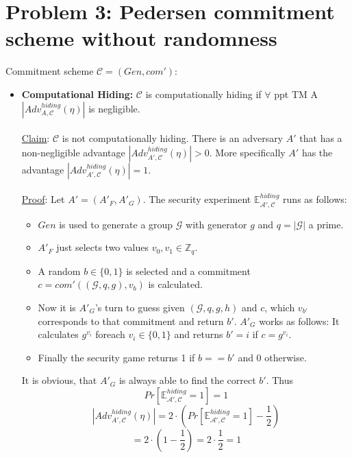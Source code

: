 \documentclass[12pt,pdftex,a4paper]{article}
\begin{document}
\section*{Problem 3: Pedersen commitment scheme without randomness}
Commitment scheme $\mathcal{C} = (Gen, com')$:
\begin{itemize}
\item \textbf{Computational Hiding:} 
$\mathcal{C}$ is computationally hiding if $\forall$ ppt TM A $|Adv_{A,\mathcal{C}}^{hiding}(\eta)|$ is negligible.
\\~\\
\underline{Claim}: $\mathcal{C}$ is not computationally hiding. There is an adversary $A'$ that has a non-negligible advantage $|Adv_{A',\mathcal{C}}^{hiding}(\eta)|>0$. More specifically $A'$ has the advantage $|Adv_{A',\mathcal{C}}^{hiding}(\eta)|=1$.
\\~\\
\underline{Proof}: Let $A' = (A'_F, A'_G)$. The security experiment $\mathbb{E}_{\mathcal{A',C}}^{hiding}$ runs as follows:
\begin{itemize}
\item $Gen$ is used to generate a group $\mathcal{G}$ with generator $g$ and $q = |\mathcal{G}|$ a prime.
\item $A'_F$ just selects two values $v_0, v_1 \in \mathbb{Z}_q$.
\item A random $b\in \{0,1\}$ is selected and a commitment $c = com'((\mathcal{G}, q, g), v_b)$ is calculated.
\item Now it is $A'_G$'s turn to guess given $(\mathcal{G}, q, g,h)$ and $c$, which $v_{b'}$ corresponds to that commitment and return $b'$. $A'_G$ works as follows: It calculates $g^{v_i}$ foreach $v_i\in \{0, 1\}$ and returns $b' = i$ if $c = g^{v_i}$.
\item Finally the security game returns 1 if $b==b'$ and 0 otherwise.
\end{itemize}

It is obvious, that $A'_G$ is always able to find the correct $b'$. Thus $$Pr[\mathbb{E}_{\mathcal{A',C}}^{hiding} = 1] = 1$$
$$|Adv_{A',\mathcal{C}}^{hiding}(\eta)| = 2 \cdot (Pr[\mathbb{E}_{\mathcal{A',C}}^{hiding} = 1] - \frac{1}{2})$$
$$= 2\cdot(1-\frac{1}{2})=2\cdot\frac{1}{2}=1$$


\end{itemize}
\end{document}
